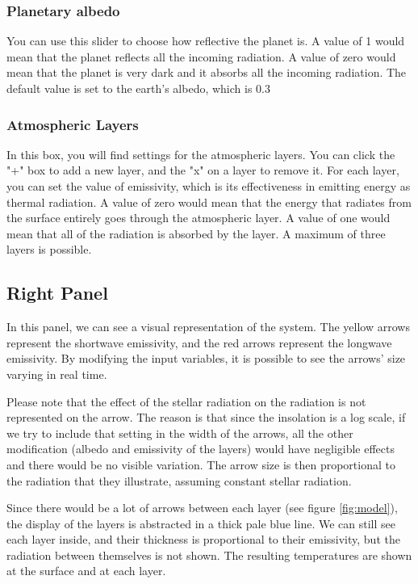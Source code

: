 \documentclass[a4paper,12pt]{article}
\begin{document}
\subsubsection*{Planetary albedo}

You can use this slider to choose how reflective the planet is. A value of 1 would mean that the planet reflects all the incoming radiation. A value of zero would mean that the planet is very dark and it absorbs all the incoming radiation. The default value is set to the earth's albedo, which is 0.3

\subsubsection*{Atmospheric Layers}

In this box, you will find settings for the atmospheric layers. You can click the "+" box to add a new layer, and the "x" on a layer to remove it. For each layer, you can set the value of emissivity, which is its effectiveness in emitting energy as thermal radiation. A value of zero would mean that the energy that radiates from the surface entirely goes through the atmospheric layer. A value of one would mean that all of the radiation is absorbed by the layer. A maximum of three layers is possible.

\subsection*{Right Panel}

In this panel, we can see a visual representation of the system. The yellow arrows represent the shortwave emissivity, and the red arrows represent the longwave emissivity. By modifying the input variables, it is possible to see the arrows' size varying in real time.

Please note that the effect of the stellar radiation on the radiation is not represented on the arrow. The reason is that since the insolation is a log scale, if we try to include that setting in the width of the arrows, all the other modification (albedo and emissivity of the layers) would have negligible effects and there would be no visible variation. The arrow size is then proportional to the radiation that they illustrate, assuming constant stellar radiation.

Since there would be a lot of arrows between each layer (see figure \ref{fig:model}), the display of the layers is abstracted in a thick pale blue line. We can still see each layer inside, and their thickness is proportional to their emissivity, but the radiation between themselves is not shown. The resulting temperatures are shown at the surface and at each layer.
\end{document}
